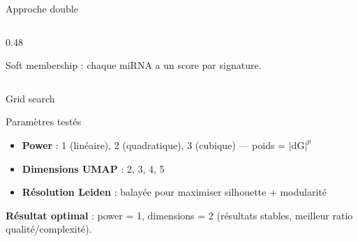 \begin{frame}{Approche double}
\begin{columns}
\begin{column}{0.48\textwidth}
\begin{center}
\end{center}

\vspace{0.5em}
\small
Soft membership : chaque miRNA a un score par signature.
\end{column}
\end{columns}
\end{frame}

\begin{frame}{Grid search}

\begin{block}{Paramètres testés}
\begin{itemize}
  \item \textbf{Power} : 1 (linéaire), 2 (quadratique), 3 (cubique) — poids = $\lvert$dG$\rvert^p$
  \item \textbf{Dimensions UMAP} : 2, 3, 4, 5
  \item \textbf{Résolution Leiden} : balayée pour maximiser silhouette + modularité
\end{itemize}
\end{block}

\vspace{0.5em}
\textbf{Résultat optimal} : power = 1, dimensions = 2 (résultats stables, meilleur ratio qualité/complexité).
\end{frame}